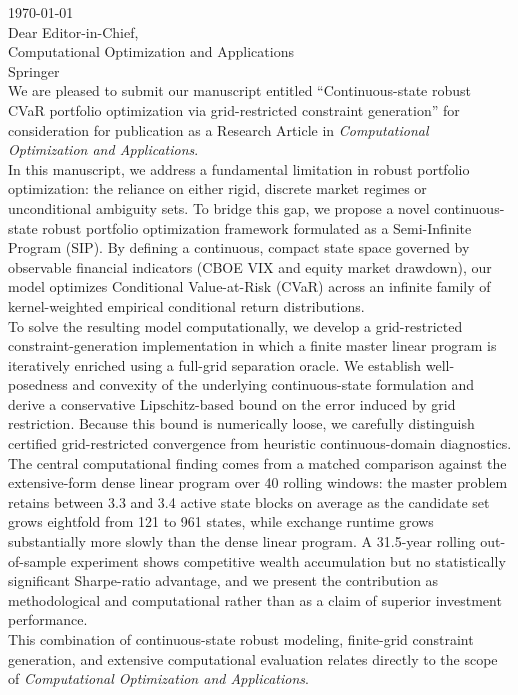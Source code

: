 \documentclass[11pt, a4paper]{article}
\begin{document}
\noindent \today\\[0.5cm]
Dear Editor-in-Chief,\\
Computational Optimization and Applications\\
Springer\\[0.5cm]
We are pleased to submit our manuscript entitled ``Continuous-state robust CVaR portfolio optimization via grid-restricted constraint generation'' for consideration for publication as a Research Article in \emph{Computational Optimization and Applications}.\\[0.12cm]
In this manuscript, we address a fundamental limitation in robust portfolio optimization: the reliance on either rigid, discrete market regimes or unconditional ambiguity sets. To bridge this gap, we propose a novel continuous-state robust portfolio optimization framework formulated as a Semi-Infinite Program (SIP). By defining a continuous, compact state space governed by observable financial indicators (CBOE VIX and equity market drawdown), our model optimizes Conditional Value-at-Risk (CVaR) across an infinite family of kernel-weighted empirical conditional return distributions.\\[0.12cm]
To solve the resulting model computationally, we develop a grid-restricted constraint-generation implementation in which a finite master linear program is iteratively enriched using a full-grid separation oracle. We establish well-posedness and convexity of the underlying continuous-state formulation and derive a conservative Lipschitz-based bound on the error induced by grid restriction. Because this bound is numerically loose, we carefully distinguish certified grid-restricted convergence from heuristic continuous-domain diagnostics. The central computational finding comes from a matched comparison against the extensive-form dense linear program over 40 rolling windows: the master problem retains between 3.3 and 3.4 active state blocks on average as the candidate set grows eightfold from 121 to 961 states, while exchange runtime grows substantially more slowly than the dense linear program. A 31.5-year rolling out-of-sample experiment shows competitive wealth accumulation but no statistically significant Sharpe-ratio advantage, and we present the contribution as methodological and computational rather than as a claim of superior investment performance.\\[0.12cm]
This combination of continuous-state robust modeling, finite-grid constraint generation, and extensive computational evaluation relates directly to the scope of \emph{Computational Optimization and Applications}.\\[0.12cm]
\end{document}

